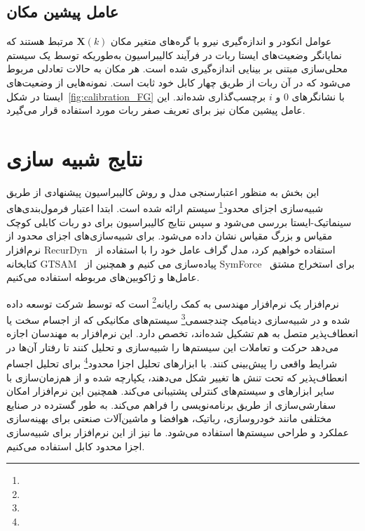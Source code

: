 \subsection{عامل پیشین مکان}
عوامل انکودر و اندازه‌گیری نیرو با گره‌های متغیر مکان $\bm{X}(k)$ مرتبط هستند که نمایانگر وضعیت‌های ایستا ربات در فرآیند کالیبراسیون به‌طوریکه توسط یک سیستم محلی‌سازی مبتنی بر بینایی اندازه‌گیری شده است. 
هر مکان به حالات تعادلی مربوط می‌شود که در آن ربات از طریق چهار کابل خود ثابت است. نمونه‌هایی از وضعیت‌های ایستا در شکل~\ref{fig:calibration_FG} با نشانگرهای $0$ و $i$ برچسب‌گذاری شده‌اند. این عامل پیشین  مکان نیز برای تعریف صفر ربات مورد استفاده قرار می‌گیرد.



\section{نتایج شبیه سازی} \label{sec:results}
این بخش به منظور اعتبارسنجی مدل و روش کالیبراسیون پیشنهادی از طریق شبیه‌سازی اجزای محدود\footnote{}
 سیستم ارائه شده است. ابتدا اعتبار فرمول‌بندی‌های سینماتیک-ایستا بررسی می‌شود و سپس نتایج کالیبراسیون برای دو ربات کابلی کوچک مقیاس و بزرگ مقیاس نشان داده می‌شود. برای شبیه‌سازی‌های اجزای محدود از نرم‌افزار RecurDyn~\cite{functionbay} استفاده خواهیم کرد، مدل گراف عامل خود را با استفاده از کتابخانه GTSAM~\cite{dellaert2012factor} پیاده‌سازی می کنیم و همچنین از SymForce~\cite{Martiros-RSS-22} برای استخراج مشتق عامل‌ها و ژاکوبین‌های مربوطه استفاده می‌کنیم.


نرم‌افزار  یک نرم‌افزار مهندسی به کمک رایانه\footnote{}
است که توسط شرکت  توسعه داده شده و در شبیه‌سازی دینامیک چندجسمی\footnote{}
 سیستم‌های مکانیکی که از اجسام سخت یا انعطاف‌پذیر متصل به هم تشکیل شده‌اند، تخصص دارد. این نرم‌افزار به مهندسان اجازه می‌دهد حرکت و تعاملات این سیستم‌ها را شبیه‌سازی و تحلیل کنند تا رفتار آن‌ها در شرایط واقعی را پیش‌بینی کنند.  با ابزارهای تحلیل اجزا محدود\footnote{}
  برای تحلیل اجسام انعطاف‌پذیر که تحت تنش ها تغییر شکل می‌دهند، یکپارچه شده و از هم‌زمان‌سازی با سایر ابزارهای  و سیستم‌های کنترلی پشتیبانی می‌کند. همچنین این نرم‌افزار امکان سفارشی‌سازی از طریق برنامه‌نویسی را فراهم می‌کند.  به طور گسترده در صنایع مختلفی مانند خودروسازی، رباتیک، هوافضا و ماشین‌آلات صنعتی برای بهینه‌سازی عملکرد و طراحی سیستم‌ها استفاده می‌شود. ما نیز از این نرم‌افزار برای شبیه‌سازی اجزا محدود کابل استفاده می‌کنیم.

